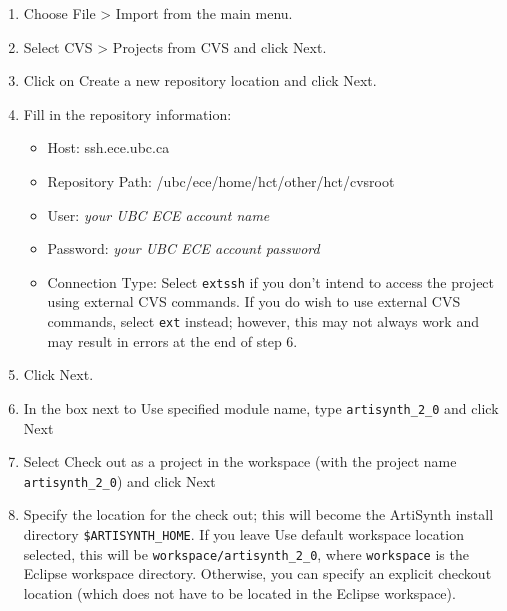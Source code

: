 \documentclass{article}
\begin{document}
\begin{enumerate}

\item Choose {\sf File > Import} from the main menu.

\item Select {\sf CVS > Projects from CVS} and click {\sf Next}.

\item Click on {\sf Create a new repository location} and click {\sf Next}.

\item Fill in the repository information:

\begin{itemize}

\item Host: ssh.ece.ubc.ca

\item Repository Path: /ubc/ece/home/hct/other/hct/cvsroot

\item User: {\it your UBC ECE account name}

\item Password: {\it your UBC ECE account password}

\item Connection Type: Select {\tt extssh} if you don't intend to
access the project using external CVS commands. If you do wish to use
external CVS commands, select {\tt ext} instead; however, this may not
always work and may result in errors at the end of step 6.

\end{itemize}

\item Click {\sf Next}.

\item In the box next to {\sf Use specified module name}, type {\tt artisynth\_2\_0}
  and click {\sf  Next}

\item Select {\sf Check out as a project in the workspace} (with the project name
  {\tt artisynth\_2\_0}) and click {\sf Next}

\item Specify the location for the check out; this will become the
  ArtiSynth install directory {\tt \$ARTISYNTH\_HOME}. If you leave {\sf Use default
  workspace location} selected, this will be {\tt workspace/artisynth\_2\_0}, where
  {\tt workspace} is the Eclipse workspace directory. Otherwise, you
  can specify an explicit checkout location (which does not have to
  be located in the Eclipse workspace).


\end{enumerate}
\end{document}
